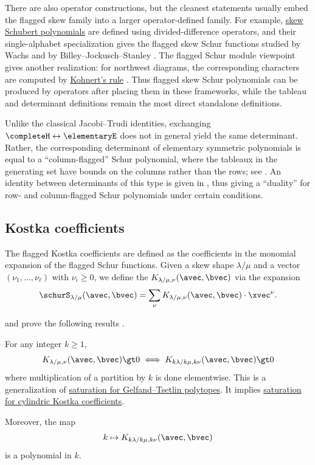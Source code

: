 There are also operator constructions, but the cleanest statements usually
embed the flagged skew family into a larger operator-defined family.  For
example, \hyperref[schubertSkew]{skew Schubert polynomials} are defined
using divided-difference operators, and their single-alphabet specialization
gives the flagged skew Schur functions studied by Wachs and by
Billey--Jockusch--Stanley
\cite{ChenYanYang2004SkewSchubert}.  The flagged Schur module viewpoint gives
another realization: for northwest diagrams, the corresponding characters are
computed by \hyperref[kohnert]{Kohnert's rule}
\cite{ArmonAssafBowlingEhrhard2023}.  Thus flagged skew Schur polynomials can
be produced by operators after placing them in these frameworks, while the
tableau and determinant definitions remain the most direct standalone
definitions.


Unlike the classical Jacobi--Trudi identities, exchanging
$\completeH \leftrightarrow \elementaryE$ does not in general yield the same
determinant.
Rather, the corresponding determinant of elementary symmetric polynomials is
equal to a \enquote{column-flagged} Schur polynomial, where the tableaux in the
generating set have bounds on the columns rather than the rows; see
\cite{Wachs1985}.
An identity between determinants of this type is given in \cite{McDowell2023},
thus giving a \enquote{duality} for row- and column-flagged Schur polynomials
under certain conditions.

\subsection[flaggedSchurKostka]{Kostka coefficients}

The flagged Kostka coefficients are defined as the coefficients in the 
monomial expansion of the flagged Schur functions. Given a skew shape $\lambda/\mu$
and a vector $(\nu_1,\dotsc,\nu_\ell)$ with $\nu_i \geq 0$, we define
the \label{flaggedKostkaCoefficientDefinition}
$K_{\lambda/\mu,\nu}(\avec,\bvec)$ via the expansion
\[
  \schurS_{\lambda/\mu}(\avec,\bvec) = \sum_{\nu}  K_{\lambda/\mu,\nu}(\avec,\bvec) \cdot \xvec^\nu.
\]

 and 
prove the following results \cite{AlexanderssonOguz2023x}.
\begin{theorem}
For any integer $k \geq 1$,
\[
 K_{\lambda/\mu,\nu}(\avec,\bvec) \gt 0 \iff
 K_{k\lambda/k\mu,k\nu}(\avec,\bvec) \gt 0
\]
where multiplication of a partition by $k$ is done elementwise.
This is a generalization of \hyperref[gtKostkaSaturation]{saturation for Gelfand--Tsetlin polytopes}.
It implies \hyperref[cylindricKostkaSaturation]{saturation for cylindric
Kostka coefficients}.

Moreover, the map
\[
 k \mapsto K_{k\lambda/k\mu,k\nu}(\avec,\bvec)
\]
is a polynomial in $k$.
\end{theorem}

